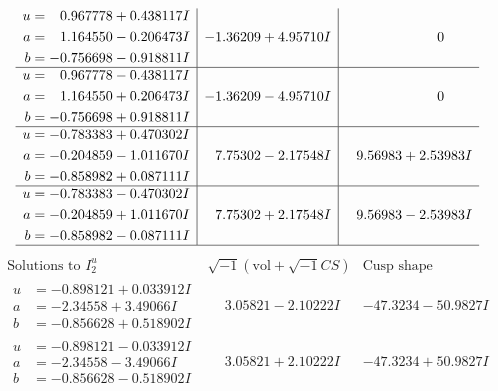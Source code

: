 \documentclass[1p]{elsarticle_modified}
\theoremstyle{definition}
\newcommand{\I}{\sqrt{-1}}
\begin{document}
$$\begin{array}{c|c|c}
\begin{aligned}
u &= \phantom{-}0.967778 + 0.438117 I \\
a &= \phantom{-}1.164550 - 0.206473 I \\
b &= -0.756698 - 0.918811 I\end{aligned}
 & -1.36209 + 4.95710 I & \phantom{-0.000000 } 0 \\ \hline\begin{aligned}
u &= \phantom{-}0.967778 - 0.438117 I \\
a &= \phantom{-}1.164550 + 0.206473 I \\
b &= -0.756698 + 0.918811 I\end{aligned}
 & -1.36209 - 4.95710 I & \phantom{-0.000000 } 0 \\ \hline\begin{aligned}
u &= -0.783383 + 0.470302 I \\
a &= -0.204859 - 1.011670 I \\
b &= -0.858982 + 0.087111 I\end{aligned}
 & \phantom{-}7.75302 - 2.17548 I & \phantom{-}9.56983 + 2.53983 I \\ \hline\begin{aligned}
u &= -0.783383 - 0.470302 I \\
a &= -0.204859 + 1.011670 I \\
b &= -0.858982 - 0.087111 I\end{aligned}
 & \phantom{-}7.75302 + 2.17548 I & \phantom{-}9.56983 - 2.53983 I\\
 \hline 
 \end{array}$$\newpage$$\begin{array}{c|c|c}  
\text{Solutions to }I^u_{2}& \I (\text{vol} + \sqrt{-1}CS) & \text{Cusp shape}\\
 \hline 
\begin{aligned}
u &= -0.898121 + 0.033912 I \\
a &= -2.34558 + 3.49066 I \\
b &= -0.856628 + 0.518902 I\end{aligned}
 & \phantom{-}3.05821 - 2.10222 I & -47.3234 - 50.9827 I \\ \hline\begin{aligned}
u &= -0.898121 - 0.033912 I \\
a &= -2.34558 - 3.49066 I \\
b &= -0.856628 - 0.518902 I\end{aligned}
 & \phantom{-}3.05821 + 2.10222 I & -47.3234 + 50.9827 I \\ \hline\begin{aligned}

\end{aligned}
\end{array}$$
\end{document}
